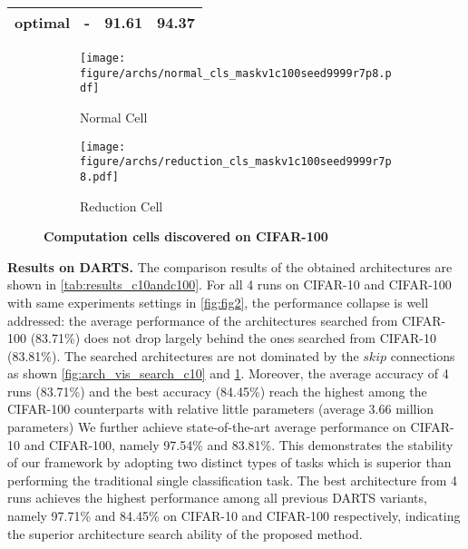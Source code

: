 \documentclass[10pt,twocolumn,letterpaper]{article}
\newcommand{\mypara}[1]{\vspace{1mm}\noindent\textbf{#1}}
\begin{document}
\begin{table}
\begin{center}
{\begin{tabular}{lccc}
      optimal                                 & -       & 91.61               & 94.37               \\\hline \end{tabular}
      }
    \label{tab:nas201}
  \end{center}
  \vspace{-6pt}
\end{table} \begin{figure}
  \centering
  \begin{subfigure}{0.8\linewidth}
    \centering
    \texttt{[image: figure/archs/normal\_cls\_maskv1c100seed9999r7p8.pdf]}
    \vspace{-6pt}
    \caption{Normal Cell}
  \end{subfigure}

  \begin{subfigure}{0.8\linewidth}
    \centering
    \texttt{[image: figure/archs/reduction\_cls\_maskv1c100seed9999r7p8.pdf]}
    \vspace{-6pt}
    \caption{Reduction Cell}
  \end{subfigure}
  \vspace{-6pt}
  \caption{\textbf{Computation cells discovered on CIFAR-100}}
  \vspace{-6pt}
  \label{fig:arch_vis_search_c100}
\end{figure} \mypara{Results on DARTS.}
The comparison results of the obtained architectures are shown in \cref{tab:results_c10andc100}.
For all 4 runs on CIFAR-10 and CIFAR-100 with same experiments settings in \cref{fig:fig2}, the performance collapse is well addressed:
the average performance of the architectures searched from CIFAR-100 (83.71\%) does not drop largely behind the ones searched from CIFAR-10 (83.81\%).
The searched architectures are not dominated by the $skip$ connections as shown \cref{fig:arch_vis_search_c10} and \cref{fig:arch_vis_search_c100}.
Moreover, the average accuracy of 4 runs (83.71\%) and the best accuracy (84.45\%) reach the highest among the CIFAR-100 counterparts with relative little parameters (average 3.66 million parameters)
We further achieve state-of-the-art average performance on CIFAR-10 and CIFAR-100, namely 97.54\% and 83.81\%. 
This demonstrates the stability of our 
framework
by adopting two distinct types of tasks which is superior than performing the traditional single classification task.
The best architecture from 4 runs achieves the highest performance among all previous DARTS variants, namely 97.71\% and 84.45\% on CIFAR-10 and CIFAR-100 respectively,
indicating the superior architecture search ability of the proposed method.
\end{document}
